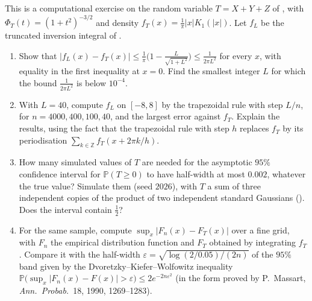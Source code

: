 \begin{exercise}\label{ex:cf-inversion-numerics}
\medium This is a computational exercise on the random variable $T=X+Y+Z$ of
, with $\Phi_T(t)=(1+t^2)^{-3/2}$ and density
$f_T(x)=\frac1\pi|x|K_1(|x|)$. Let $f_L$ be the truncated inversion integral of
.
\begin{enumerate}[label=(\alph*)]
  \item Show that $|f_L(x)-f_T(x)|\le\frac1\pi\big(1-\frac L{\sqrt{1+L^2}}\big)\le\frac1{2\pi L^2}$ for
    every $x$, with equality in the first inequality at $x=0$. Find the smallest integer $L$ for
    which the bound $\frac1{2\pi L^2}$ is below $10^{-4}$.
  \item With $L=40$, compute $f_L$ on $[-8,8]$ by the trapezoidal rule with step $L/n$, for
    $n=4000,400,100,40$, and the largest error against $f_T$. Explain the results, using the fact
    that the trapezoidal rule with step $h$ replaces $f_T$ by its periodisation
    $\sum_{k\in\mathbb Z}f_T(x+2\pi k/h)$.
  \item How many simulated values of $T$ are needed for the asymptotic $95\%$ confidence interval
    for $\mathbb P(T\ge0)$ to have half-width at most $0.002$, whatever the true value? Simulate
    them (seed $2026$), with $T$ a sum of three independent copies of the product of two
    independent standard Gaussians (). Does the interval contain
    $\frac12$?
  \item For the same sample, compute $\sup_x|F_n(x)-F_T(x)|$ over a fine grid, with $F_n$ the
    empirical distribution function and $F_T$ obtained by integrating $f_T$. Compare it with the
    half-width $\varepsilon=\sqrt{\log(2/0.05)/(2n)}$ of the $95\%$ band given by the
    Dvoretzky--Kiefer--Wolfowitz inequality
    $\mathbb P\big(\sup_x|F_n(x)-F(x)|>\varepsilon\big)\le2e^{-2n\varepsilon^2}$ (in the form proved by
    P.~Massart, \emph{Ann.\ Probab.}\ 18, 1990, 1269--1283).
\end{enumerate}
\end{exercise}


